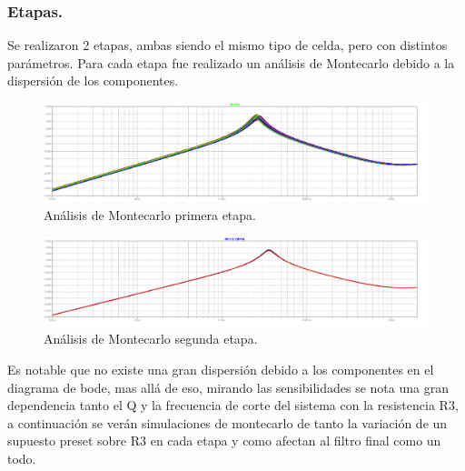 \subsubsection{Etapas.}
Se realizaron 2 etapas, ambas siendo el mismo tipo de celda, pero con distintos parámetros. Para cada etapa fue realizado un análisis de Montecarlo debido a la dispersión de los componentes.

\begin{figure}[H]
	\centering
	\includegraphics[width=\textwidth]{Imagenes-Ej2/mcE1.png}
	\caption{Análisis de Montecarlo primera etapa.}
	\label{fig:mcrauch}
\end{figure}

\begin{figure}[H]
	\centering
	\includegraphics[width=\textwidth]{Imagenes-Ej2/mcE2.png}
	\caption{Análisis de Montecarlo segunda etapa.}
	\label{fig:mcrauch}
\end{figure}
Es notable que no existe una gran dispersión debido a los componentes en el diagrama de bode, mas allá de eso, mirando las sensibilidades se nota una gran dependencia tanto el Q y la frecuencia de corte del sistema con la resistencia R3, a continuación se verán simulaciones de montecarlo de tanto la variación de un supuesto preset sobre R3 en cada etapa y como afectan al filtro final como un todo.

